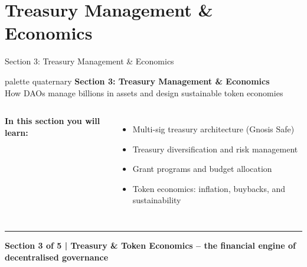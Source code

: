 \documentclass[8pt,aspectratio=169]{beamer}
\newcommand{\bottomnote}[1]{\vfill\vspace{-2mm}\textcolor{mllavender2}{\rule{\textwidth}{0.4pt}}\vspace{1mm}\footnotesize\textbf{#1}}
\begin{document}
\section{Treasury Management \& Economics}

\begin{frame}{Section 3: Treasury Management \& Economics}
\vspace{4mm}
\begin{beamercolorbox}[sep=12pt,center,rounded=true,shadow=true]{palette quaternary}
{\Large\bfseries Section 3: Treasury Management \& Economics}\\[6pt]
{\normalsize How DAOs manage billions in assets and design sustainable token economies}
\end{beamercolorbox}
\vspace{2mm}
\begin{columns}[T]
\textbf{\textcolor{mlpurple}{In this section you will learn:}}
\begin{itemize}\setlength\itemsep{5pt}
  \item Multi-sig treasury architecture (Gnosis Safe)
  \item Treasury diversification and risk management
  \item Grant programs and budget allocation
  \item Token economics: inflation, buybacks, and sustainability
\end{itemize}
\end{columns}
\bottomnote{Section 3 of 5 | Treasury \& Token Economics -- the financial engine of decentralised governance}
\end{frame}
\end{document}
